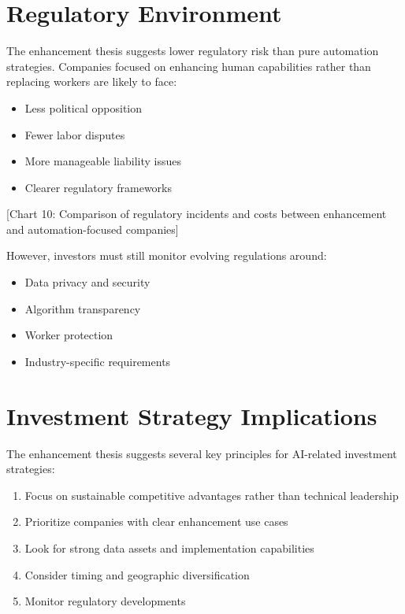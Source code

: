 \documentclass[
  Letterpaper,
]{scrbook}
\providecommand{\tightlist}{%
  \setlength{\itemsep}{0pt}\setlength{\parskip}{0pt}}\usepackage{longtable,booktabs,array}
\begin{document}
\section{Regulatory Environment}\label{regulatory-environment}

The enhancement thesis suggests lower regulatory risk than pure
automation strategies. Companies focused on enhancing human capabilities
rather than replacing workers are likely to face:

\begin{itemize}
\tightlist
\item
  Less political opposition
\item
  Fewer labor disputes
\item
  More manageable liability issues
\item
  Clearer regulatory frameworks
\end{itemize}

{[}Chart 10: Comparison of regulatory incidents and costs between
enhancement and automation-focused companies{]}

However, investors must still monitor evolving regulations around:

\begin{itemize}
\tightlist
\item
  Data privacy and security
\item
  Algorithm transparency
\item
  Worker protection
\item
  Industry-specific requirements
\end{itemize}

\section{Investment Strategy
Implications}\label{investment-strategy-implications}

The enhancement thesis suggests several key principles for AI-related
investment strategies:

\begin{enumerate}
\def\labelenumi{\arabic{enumi}.}
\tightlist
\item
  Focus on sustainable competitive advantages rather than technical
  leadership
\item
  Prioritize companies with clear enhancement use cases
\item
  Look for strong data assets and implementation capabilities
\item
  Consider timing and geographic diversification
\item
  Monitor regulatory developments
\end{enumerate}
\end{document}
